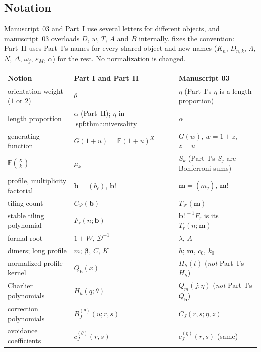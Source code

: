 \documentclass[11pt]{article}
\numberwithin{equation}{section}
\theoremstyle{definition}
\theoremstyle{remark}
\theoremstyle{definition}
\newcommand{\E}{\mathbb E}
\newcommand{\bfac}{\mathbf b!}
\begin{document}
\subsection{Notation}
\label{fga:sec:notation}

Manuscript~03 and Part~I use several letters for different objects, and
manuscript~03 overloads $D$, $w$, $T$, $A$ and $B$ internally.
 fixes the convention: Part~II uses Part~I's names
for every shared object and new names ($K_n$, $D_{n,k}$, $\Lambda$, $N$,
$\Delta$, $\omega_j$, $\varepsilon_M$, $\alpha$) for the rest. No
normalization is changed.

\begin{table}[htbp]
\centering\small
\renewcommand{\arraystretch}{1.12}
\begin{tabular}{@{}>{\raggedright\arraybackslash}p{}>{\raggedright\arraybackslash}p{}>{\raggedright\arraybackslash}p{}@{}}
\toprule
Notion & Part I and Part II & Manuscript 03\\
\midrule
orientation weight ($1$ or $2$) & $\theta$ & $\eta$ (Part~I's $\eta$ is a
length proportion)\\
length proportion & $\alpha$ (Part~II); $\eta$ in \cref{spf:thm:universality} & $\alpha$\\
generating function & $G(1+u)=\E(1+u)^X$ & $G(w)$, $w=1+z$, $z=u$\\
$\E\binom Xk$ & $\mu_k$ & $S_k$ (Part~I's $S_j$ are Bonferroni sums)\\
profile, multiplicity factorial & $\mathbf b=(b_\ell)$, $\bfac$ & $\mathbf m=(m_j)$, $\mathbf m!$\\
tiling count & $C_{\mathcal P}(\mathbf b)$ & $T_{\mathcal F}(\mathbf m)$\\
stable tiling polynomial & $F_r(n;\mathbf b)$ & $\bfac^{\,-1}F_r$ is its $T_r(n;\mathbf m)$\\
formal root & $1+W$, $\mathcal D^{-1}$ & $\lambda$, $A$\\
dimers; long profile & $m$; $\boldsymbol\beta$, $C$, $K$ & $h$; $\mathbf m$, $c_0$, $k_0$\\
normalized profile kernel & $Q_{\mathbf b}(x)$ & $H_h(t)$ (\emph{not} Part~I's $H_h$)\\
Charlier polynomials & $H_h(q;\theta)$ & $Q_m(j;\eta)$ (\emph{not} Part~I's $Q_{\mathbf b}$)\\
correction polynomials & $B_J^{(\theta)}(u;r,s)$ & $C_J(r,s;\eta,z)$\\
avoidance coefficients & $c_J^{(\theta)}(r,s)$ & $c_J^{(\eta)}(r,s)$ (same)\\

\end{tabular}
\end{table}
\end{document}
